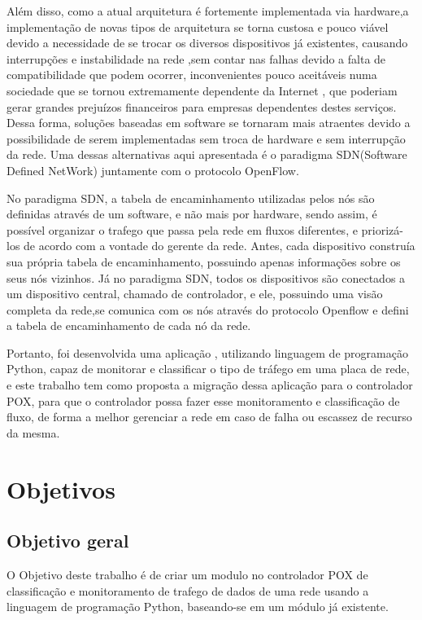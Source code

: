 Além disso, como a atual arquitetura é fortemente implementada via hardware,a implementação de novas tipos de arquitetura se torna custosa e pouco viável devido a necessidade de se trocar os diversos dispositivos já existentes, causando interrupções e instabilidade na rede ,sem contar nas falhas devido a falta de compatibilidade que podem ocorrer, inconvenientes pouco aceitáveis numa sociedade que se tornou extremamente dependente da Internet , que poderiam gerar grandes prejuízos financeiros para empresas dependentes destes serviços. Dessa forma, soluções baseadas em software se tornaram mais atraentes devido a possibilidade de serem implementadas sem troca de hardware e sem interrupção da rede. Uma dessas alternativas aqui apresentada é o paradigma SDN(Software Defined NetWork) juntamente com o protocolo OpenFlow.

No paradigma SDN, a tabela de encaminhamento utilizadas pelos  nós são definidas através de um software, e não mais por hardware, sendo assim, é possível organizar o trafego que passa pela rede em fluxos diferentes, e priorizá-los de acordo com a vontade do gerente da rede. Antes, cada dispositivo construía sua própria tabela de encaminhamento, possuindo apenas informações sobre os seus nós vizinhos. Já no paradigma SDN, todos os dispositivos são conectados a um dispositivo central, chamado de controlador, e ele, possuindo uma visão  completa da rede,se comunica com os nós através do protocolo Openflow e defini a tabela de encaminhamento de cada nó da rede.

Portanto, foi desenvolvida uma aplicação , utilizando linguagem de programação Python, capaz de monitorar e classificar o tipo de tráfego em uma placa de rede, e este trabalho tem como proposta a migração dessa aplicação para o controlador POX, para que o controlador possa fazer esse monitoramento e classificação de fluxo, de forma a melhor gerenciar a rede em caso de falha ou escassez de recurso da mesma.


\section{Objetivos}
\subsection{Objetivo geral}
O Objetivo deste trabalho é de criar um modulo no controlador POX de classificação e monitoramento de trafego de dados de uma rede usando a linguagem de programação Python, baseando-se em um módulo já existente.


